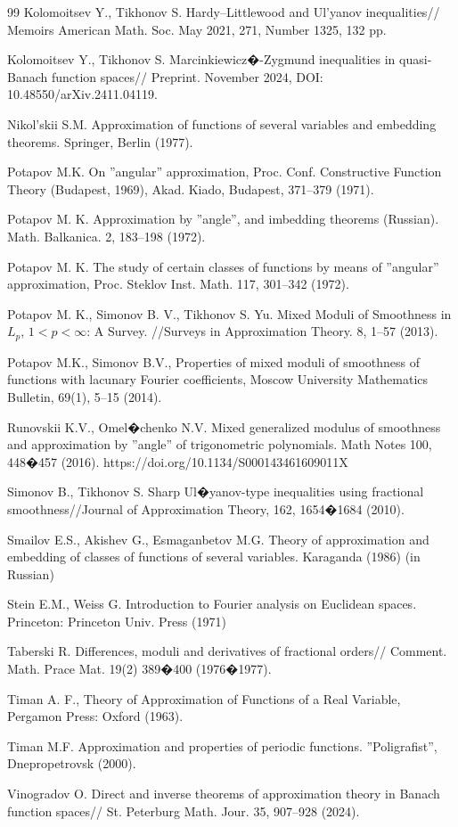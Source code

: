 \documentclass[12pt]{article}
\theoremstyle{plain}
\begin{document}
\begin{thebibliography}{99}
 Kolomoitsev Y., Tikhonov S. Hardy--Littlewood and Ul'yanov inequalities// Memoirs American Math. Soc. May 2021, 271, Number 1325, 132 pp. 
 
  Kolomoitsev Y., Tikhonov S. Marcinkiewicz�-Zygmund inequalities
in quasi-Banach function spaces// Preprint. November 2024,
DOI: 10.48550/arXiv.2411.04119.
 
  Nikol'skii S.M. Approximation of functions of several variables and embedding theorems. Springer, Berlin (1977).

  Potapov M.K. On ''angular'' approximation, Proc. Conf. Constructive Function Theory (Budapest, 1969), Akad. Kiado, Budapest, 371--379  (1971). 

 Potapov M. K. Approximation by ''angle'', and imbedding theorems (Russian). Math. Balkanica. 2, 183--198 (1972).

  Potapov  M. K. The study of certain classes of functions by means of ''angular'' approximation, Proc. Steklov Inst. Math. 117, 301--342 (1972).

 Potapov M. K., Simonov B. V., Tikhonov S. Yu. 
Mixed Moduli of Smoothness in $L_{p}$, $1 < p < \infty$:
A Survey. //Surveys in Approximation Theory.  8,  1--57 (2013).

 Potapov M.K.,  Simonov B.V., Properties of mixed moduli of smoothness of functions with lacunary Fourier coefficients,
Moscow University Mathematics Bulletin, 69(1), 5--15 (2014).
 
  Runovskii K.V., Omel�chenko N.V. Mixed generalized modulus of smoothness and approximation by ''angle'' of trigonometric polynomials. Math Notes 100, 448�457 (2016). https://doi.org/10.1134/S000143461609011X

 Simonov B., Tikhonov S. Sharp Ul�yanov-type inequalities using fractional smoothness//Journal of Approximation Theory, 162, 1654�1684 (2010).

 Smailov E.S.,  Akishev G., Esmaganbetov M.G. Theory of approximation and embedding of classes of functions of several variables. Karaganda (1986) %
(in Russian)

 Stein E.M., Weiss G.  Introduction to Fourier analysis on
Euclidean spaces. Princeton: Princeton Univ. Press (1971)%

Taberski R. Differences, moduli and derivatives of fractional orders// Comment. Math. Prace Mat. 19(2) 389�400 (1976�1977).

  Timan A. F., Theory of Approximation of Functions of a Real Variable, Pergamon Press: Oxford (1963).

  Timan M.F. Approximation and properties of periodic functions. ''Poligrafist'', Dnepropetrovsk (2000). %

 Vinogradov O. Direct and inverse theorems of approximation theory in Banach function spaces// St. Peterburg Math. Jour. 35, 907--928 (2024).
\end{thebibliography}
\end{document}
